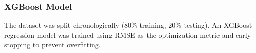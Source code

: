 \documentclass[
]{article}
\newenvironment{Shaded}{\begin{snugshade}}{\end{snugshade}}
\newcommand{\AttributeTok}[1]{\textcolor[rgb]{0.13,0.29,0.53}{#1}}
\newcommand{\DecValTok}[1]{\textcolor[rgb]{0.00,0.00,0.81}{#1}}
\newcommand{\FunctionTok}[1]{\textcolor[rgb]{0.13,0.29,0.53}{\textbf{#1}}}
\newcommand{\NormalTok}[1]{#1}
\newcommand{\OtherTok}[1]{\textcolor[rgb]{0.56,0.35,0.01}{#1}}
\newcommand{\SpecialCharTok}[1]{\textcolor[rgb]{0.81,0.36,0.00}{\textbf{#1}}}
\begin{document}
\begin{Shaded}
\end{Shaded}

\subsubsection{XGBoost Model}\label{xgboost-model}

The dataset was split chronologically (80\% training, 20\% testing). An
XGBoost regression model was trained using RMSE as the optimization
metric and early stopping to prevent overfitting.
\end{document}
